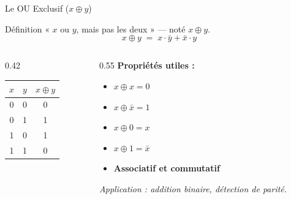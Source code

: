 \begin{frame}{Le OU Exclusif (\(x \oplus y\))}

    \begin{block}{Définition}
        « \(x\) ou \(y\), mais pas les deux » — noté \(x \oplus y\).
        \[
            x \oplus y \;=\; x \cdot \bar{y} + \bar{x} \cdot y
        \]
    \end{block}

    \vspace{0.4cm}

    \begin{columns}[T]
        \begin{column}{0.42\textwidth}
            \centering
            \begin{tabular}{|c|c|c|}
                \hline
                \(x\) & \(y\) & \(x \oplus y\) \\
                \hline
                0 & 0 & 0 \\
                0 & 1 & 1 \\
                1 & 0 & 1 \\
                1 & 1 & 0 \\
                \hline
            \end{tabular}
        \end{column}
        \begin{column}{0.55\textwidth}
            \textbf{Propriétés utiles :}
            \begin{itemize}
                \item \(x \oplus x = 0\)
                \item \(x \oplus \bar{x} = 1\)
                \item \(x \oplus 0 = x\)
                \item \(x \oplus 1 = \bar{x}\)
                \item \textbf{Associatif et commutatif}
            \end{itemize}

            \vspace{0.2cm}
            \textit{Application : addition binaire, détection de parité.}
        \end{column}
    \end{columns}

\end{frame}

